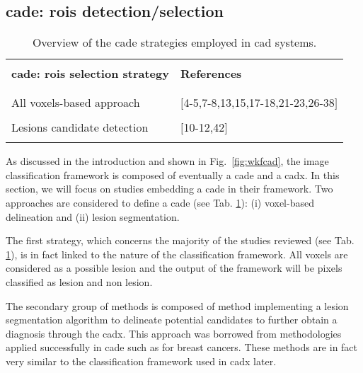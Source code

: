 \subsection{\ac{cade}: \acp{roi} detection/selection}\label{cade}

\begin{table}
	\caption{Overview of the \ac{cade} strategies employed in \ac{cad} systems.}
	\small
	\begin{tabular}{p{.65\linewidth} p{.25\linewidth}}
		\hline \\ [-1.5ex]
		\textbf{\ac{cade}: \acp{roi} selection strategy} & \textbf{References} \\ \\ [-1.5ex]
		\hline \\ [-1.5ex]
		\quad All voxels-based approach & $[$4-5,7-8,13,15,17-18,21-23,26-38$]$ \\ \\ [-1.5ex]
		\quad Lesions candidate detection & $[$10-12,42$]$ \\ \\ [-1.5ex]
		\hline
	\end{tabular}
	\label{tab:cade}
\end{table}

As discussed in the introduction and shown in Fig.~\ref{fig:wkfcad}, the image classification framework is composed of eventually a \ac{cade} and a \ac{cadx}. In this section, we will focus on studies embedding a \ac{cade} in their framework. Two approaches are considered to define a \ac{cade} (see Tab. \ref{tab:cade}): (i) voxel-based delineation and (ii) lesion segmentation.

The first strategy, which concerns the majority of the studies reviewed (see Tab. \ref{tab:cade}), is in fact linked to the nature of the classification framework. All voxels are considered as a possible lesion and the output of the framework will be pixels classified as lesion and non lesion.

The secondary group of methods is composed of method implementing a lesion segmentation algorithm to delineate potential candidates to further obtain a diagnosis through the \ac{cadx}. This approach was borrowed from methodologies applied successfully in \ac{cade} such as for breast cancers. These methods are in fact very similar to the classification framework used in \ac{cadx} later.


